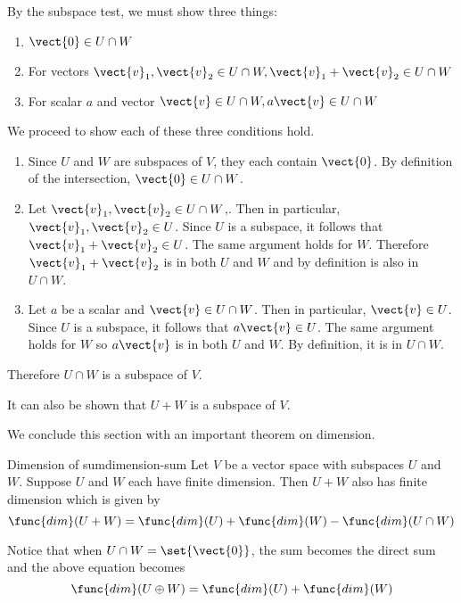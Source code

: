 \begin{solution}
By the subspace test, we must show three things:
\begin{enumerate}
\item $\vect{0} \in U \cap W$
\item For vectors $\vect{v}_1, \vect{v}_2 \in U \cap W, \vect{v}_1+\vect{v}_2 \in U \cap W$
\item For scalar $a$ and vector $\vect{v} \in U \cap W, a\vect{v} \in U \cap W$
\end{enumerate}

We proceed to show each of these three conditions hold.
\begin{enumerate}
\item 
Since $U$ and $W$ are subspaces of $V$, they each contain $\vect{0}$. By definition of the intersection, $\vect{0} \in U \cap W$. 

\item
Let  $\vect{v}_1, \vect{v}_2 \in U \cap W$,. Then in particular,  $\vect{v}_1, \vect{v}_2 \in U$. Since $U$ is a subspace, it follows that $ \vect{v}_1+\vect{v}_2 \in U$. The same argument holds for $W$. Therefore $\vect{v}_1+\vect{v}_2$ is in both $U$ and $W$ and by definition is also in $U \cap W$. 

\item 
Let $a$ be a scalar and $\vect{v} \in U \cap W$. Then in particular, $\vect{v} \in U$. Since $U$ is a subspace, it follows that $a \vect{v} \in U$. The same argument holds for $W$ so $a\vect{v}$ is in both $U$ and $W$. By definition, it is in $U \cap W$. 
\end{enumerate}

Therefore $U \cap W$ is a subspace of $V$. 
\end{solution}

It can also be shown that $U + W$ is a subspace of $V$.

We conclude this section with an important theorem on dimension.

\begin{theorem}{Dimension of sum}{dimension-sum}
Let $V$ be a vector space with subspaces $U$ and $W$. Suppose $U$ and $W$ each have finite dimension. Then $U + W$ also has finite dimension which is given by\[
\func{dim} (U+W) = \func{dim}(U) + \func{dim}(W) - \func{dim} (U \cap W)
\]
\end{theorem}

Notice that when $U \cap W = \set{\vect{0} }$, the sum becomes the direct sum and the above equation becomes 
\[
\func{dim} (U \oplus W) = \func{dim}(U) + \func{dim}(W)
\]
